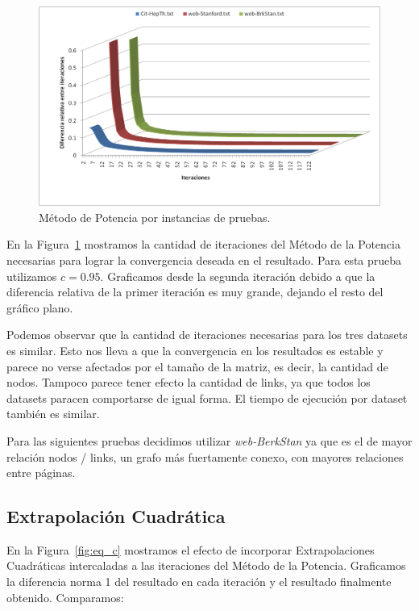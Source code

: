 \begin{figure}[!htbp]
  \begin{center}
    \includegraphics[scale=0.35]{img/datasets.png}
    \caption{\label{fig:datasets} Método de Potencia por instancias de pruebas.}
  \end{center}
\end{figure}

En la Figura~\ref{fig:datasets} mostramos la cantidad de iteraciones del Método
de la Potencia necesarias para lograr la convergencia deseada en el resultado.
Para esta prueba utilizamos $c=0.95$. Graficamos desde la segunda iteración
debido a que la diferencia relativa de la primer iteración es muy grande,
dejando el resto del gráfico plano.

Podemos observar que la cantidad de iteraciones necesarias para los tres
datasets es similar. Esto nos lleva a que la convergencia en los resultados es
estable y parece no verse afectados por el tamaño de la matriz, es decir, la
cantidad de nodos. Tampoco parece tener efecto la cantidad de links, ya que
todos los datasets paracen comportarse de igual forma. El tiempo de ejecución
por dataset también es similar.

Para las siguientes pruebas decidimos utilizar \emph{web-BerkStan} ya que es el
de mayor relación nodos / links, un grafo más fuertamente conexo, con mayores
relaciones entre páginas.

\subsection{Extrapolación Cuadrática}

En la Figura~\ref{fig:eq_c} mostramos el efecto de incorporar Extrapolaciones
Cuadráticas intercaladas a las iteraciones del Método de la Potencia.
Graficamos la diferencia norma 1 del resultado en cada iteración y el resultado
finalmente obtenido. Comparamos:

